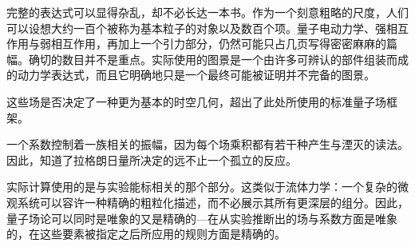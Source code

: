 \begin{classroomqa}
\end{classroomqa}

完整的表达式可以显得杂乱，却不必长达一本书。作为一个刻意粗略的尺度，人们可以设想大约一百个被称为基本粒子的对象以及数百个项。量子电动力学、强相互作用与弱相互作用，再加上一个引力部分，仍然可能只占几页写得密密麻麻的篇幅。确切的数目并不是重点。实际使用的图景是一个由许多可辨认的部件组装而成的动力学表达式，而且它明确地只是一个最终可能被证明并不完备的图景。

这些场是否决定了一种更为基本的时空几何，超出了此处所使用的标准量子场框架。

\begin{classroomqa}
\end{classroomqa}

一个系数控制着一族相关的振幅，因为每个场乘积都有若干种产生与湮灭的读法。因此，知道了拉格朗日量所决定的远不止一个孤立的反应。

\begin{classroomqa}
\end{classroomqa}

实际计算使用的是与实验能标相关的那个部分。这类似于流体力学：一个复杂的微观系统可以容许一种精确的粗粒化描述，而不必展示其所有更深层的组分。因此，量子场论可以同时是唯象的又是精确的---在从实验推断出的场与系数方面是唯象的，在这些要素被指定之后所应用的规则方面是精确的。

\begin{classroomqa}
\end{classroomqa}

